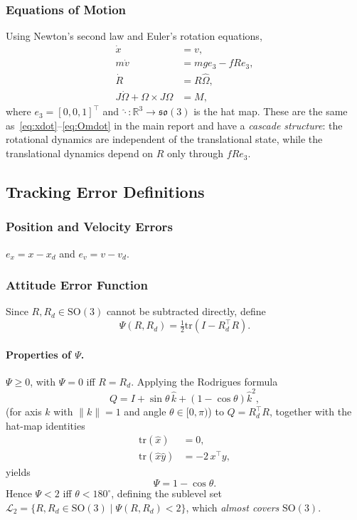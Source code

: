 \documentclass[11pt]{article}
\theoremstyle{remark}
\newcommand{\SO}{\mathrm{SO}(3)}
\newcommand{\so}{\mathfrak{so}(3)}
\newcommand{\R}{\mathbb{R}}
\newcommand{\tr}{\mathrm{tr}}
\newcommand{\hatmap}[1]{\widehat{#1}}
\begin{document}
\subsubsection{Equations of Motion}
Using Newton's second law and Euler's rotation equations,
\begin{align*}
    \dot{x} &= v,\\
    m\dot{v} &= mge_3 - f R e_3,\\
    \dot{R} &= R\hatmap{\Omega},\\
    J\dot{\Omega} + \Omega \times J\Omega &= M,
\end{align*}
where $e_3 = [0, 0, 1]^\top$ and $\hatmap{\cdot}: \R^3 \to \so$ is the hat map. These are the same as~\eqref{eq:xdot}--\eqref{eq:Omdot} in the main report and have a \emph{cascade structure}: the rotational dynamics are independent of the translational state, while the translational dynamics depend on $R$ only through $fRe_3$.

\subsection{Tracking Error Definitions}
\label{app:errors}

\subsubsection{Position and Velocity Errors}
$e_x = x - x_d$ and $e_v = v - v_d$.

\subsubsection{Attitude Error Function}
Since $R, R_d \in \SO$ cannot be subtracted directly, define
\begin{equation}
    \Psi(R, R_d) = \tfrac{1}{2}\tr\!\left(I - R_d^\top R\right).
    \label{eq:Psi}
\end{equation}

\paragraph{Properties of $\Psi$.}
$\Psi \geq 0$, with $\Psi = 0$ iff $R = R_d$. Applying the Rodrigues formula
\begin{equation}
    Q = I + \sin\theta\,\hatmap{k} + (1-\cos\theta)\hatmap{k}^2,
    \label{eq:rodrigues}
\end{equation}
(for axis $k$ with $\|k\|=1$ and angle $\theta \in [0,\pi)$) to $Q = R_d^\top R$, together with the hat-map identities
\begin{align}
    \tr(\hatmap{x}) &= 0, \label{eq:hat_trace}\\
    \tr(\hatmap{x}\hatmap{y}) &= -2\,x^\top y, \label{eq:hat_trace_product}
\end{align}
yields
\begin{equation}
    \Psi = 1 - \cos\theta.
    \label{eq:Psi_cos}
\end{equation}
Hence $\Psi < 2$ iff $\theta < 180^\circ$, defining the sublevel set $\mathcal{L}_2 = \{R,R_d \in \SO \mid \Psi(R,R_d) < 2\}$, which \emph{almost covers} $\SO$.
\end{document}
